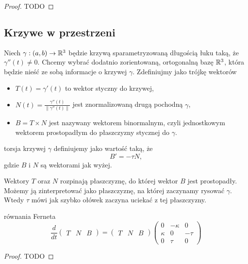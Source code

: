 \begin{proof}TODO
\end{proof}

\subsection{Krzywe w przestrzeni}

Niech $\gamma:(a,b)\to \mathbb{R}^3$ będzie krzywą sparametryzowaną długością łuku taką, że $\gamma''(t)\neq 0$. Chcemy wybrać dodatnio zorientowaną, ortogonalną bazę $\mathbb{R}^3$, która będzie nieść ze sobą informacje o krzywej $\gamma$. Zdefiniujmy  jako trójkę wektorów
\begin{itemize}
  \item $T(t)=\gamma'(t)$ to wektor styczny do krzywej,
  \item $N(t)=\frac{\gamma''(t)}{\|\gamma''(t)\|}$ jest znormalizowaną drugą pochodną $\gamma$,
  \item $B=T\times N$ jest nazywany wektorem binormalnym, czyli jednostkowym wektorem prostopadłym do płaszczyzny stycznej do $\gamma$.
\end{itemize}

\begin{definition}{torsja}{}
   krzywej $\gamma$ definiujemy jako wartość taką, że
  $$B'=-\tau N,$$
  gdzie $B$ i $N$ są wektorami jak wyżej.
\end{definition}

Wektory $T$ oraz $N$ rozpinają płaszczyznę, do której wektor $B$ jest prostopadły. Możemy ją zinterpretować jako płaszczyznę, na której zaczynamy rysować $\gamma$. Wtedy $\tau$ mówi jak szybko ołówek zaczyna uciekać z tej płaszczyzny.

\begin{theorem}{równania Ferneta}{}
  $$\frac{d}{dt}\begin{pmatrix}T&N&B\end{pmatrix} = \begin{pmatrix}T&N&B\end{pmatrix}\begin{pmatrix}
  0 & -\kappa & 0\\ 
  \kappa & 0 & -\tau\\ 
  0 & \tau & 0
\end{pmatrix}$$
\end{theorem}

\begin{proof}TODO
\end{proof}

